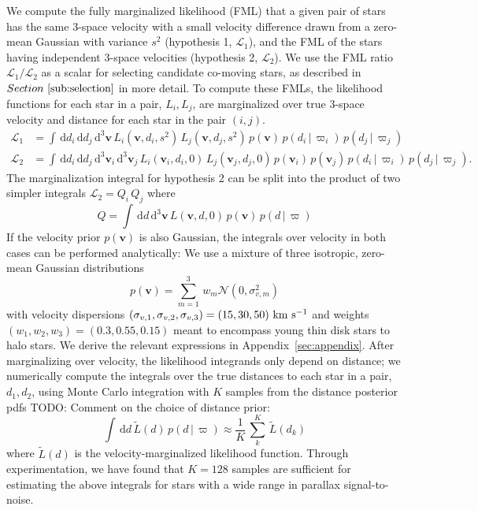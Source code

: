 \documentclass[manuscript, letterpaper]{aastex6}
\newcommand{\sectionname}{Section}
\newcommand{\given}{\,|\,}
\newcommand{\dd}{\mathrm{d}}
\newcommand{\bs}[1]{\boldsymbol{#1}}
\renewcommand{\vec}[1]{\bs{#1}}
\newcommand{\kms}{\ensuremath{\rm km~s^{-1}}}
\newcommand{\todo}[1]{{\color{red}TODO: #1}}
\begin{document}
We compute the fully marginalized likelihood (FML) that a given pair of stars
has the same 3-space velocity with a small velocity difference drawn from a
zero-mean Gaussian with variance $s^2$ (hypothesis 1, $\mathcal{L}_1$), and
the FML of the stars having independent 3-space velocities (hypothesis 2,
$\mathcal{L}_2$).
We use the FML ratio $\mathcal{L}_1/\mathcal{L}_2$ as a scalar for selecting
candidate co-moving stars, as described in $\sectionname~\ref{sub:selection}$ in
more detail.
To compute these FMLs, the likelihood functions for each star in a pair, $L_i,
L_j$, are marginalized over true 3-space velocity and distance for each star in
the pair $(i,j)$.
\begin{align}
  \mathcal{L}_1 &=
    \int \, \dd d_i \, \dd d_j \, \dd^3 \vec{v} \,
    L_i(\vec{v}, d_i, s^2) \,
    L_j(\vec{v}, d_j, s^2) \,
    p(\vec{v}) \, p(d_i \given \varpi_i) \, p(d_j \given \varpi_j) \\
  \mathcal{L}_2 &=
    \int \, \dd d_i \, \dd d_j \, \dd^3 \vec{v}_i \, \dd^3 \vec{v}_j \,
    L_i(\vec{v}_i, d_i, 0) \,
    L_j(\vec{v}_j, d_j, 0) \,
    p(\vec{v}_i) \, p(\vec{v}_j) \, p(d_i \given \varpi_i) \, p(d_j \given \varpi_j). \label{eq:hyp2}
\end{align}
The marginalization integral for hypothesis 2 can be split into the product of
two simpler integrals $\mathcal{L}_2 = Q_i \, Q_j$ where
\begin{equation}
  Q = \int \, \dd d \, \dd^3 \vec{v} \, L(\vec{v}, d, 0) \, p(\vec{v}) \, p(d\given\varpi)
\end{equation}
If the velocity prior $p(\vec{v})$ is also Gaussian, the integrals over velocity
in both cases can be performed analytically:
We use a mixture of three isotropic, zero-mean Gaussian distributions
\begin{equation}
  p(\vec{v}) = \sum_{m=1}^3 \, w_m \mathcal{N}(0, \sigma_{v,m}^2)
\end{equation}
with velocity dispersions $(\sigma_{v,1}, \sigma_{v,2}, \sigma_{v,3}) = (15, 30, 50)
~\kms$ and weights $(w_1,w_2,w_3) = (0.3, 0.55, 0.15)$
meant to encompass young thin disk stars to halo stars.
We derive the relevant expressions in Appendix~\ref{sec:appendix}.
After marginalizing over velocity, the likelihood integrands only depend on
distance; we numerically compute the integrals over the true distances to each
star in a pair, $d_1,d_2$, using Monte Carlo integration with $K$ samples from
the distance posterior pdfs \todo{Comment on the choice of distance prior}:
\begin{equation}
  \int \, \dd d \, \tilde{L}(d) \, p(d\given\varpi) \approx
    \frac{1}{K} \, \sum_k^K \, \tilde{L}(d_k)
\end{equation}
where $\tilde{L}(d)$ is the velocity-marginalized likelihood function.
Through experimentation, we have found that $K=128$ samples are sufficient for
estimating the above integrals for stars with a wide range in parallax
signal-to-noise.
\end{document}
